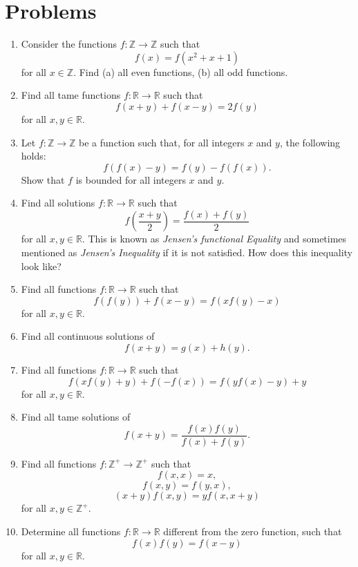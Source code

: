 \documentclass[11pt,a5paper]{article}
\begin{document}
\section{Problems}

\begin{enumerate}

\item{Consider the functions  $f: \mathbb{Z} \to \mathbb{Z}$ such that 
\[f(x)=f(x^2+x+1)\]
for all $x \in \mathbb{Z}$. Find (a) all even functions, (b) all odd functions.}

\item{Find all tame functions $f: \mathbb{R} \to \mathbb{R}$  such that
\[f(x+y)+f(x-y)=2f(y)\]
for all $x,y \in \mathbb{R}$.}

\item{Let $f: \mathbb{Z} \to \mathbb{Z}$ be a function such that, for all integers $x$ and $y$, the following holds:
\[f(f(x)-y)=f(y)-f(f(x)).\]
Show that $f$ is bounded for all integers $x$ and $y$.}

\item{Find all solutions $f: \mathbb{R} \to \mathbb{R}$  such that
\[f\left(\frac{x+y}{2}\right)=\frac{f(x)+f(y)}{2}\]
for all $x,y \in \mathbb{R}$. This is known as \emph{Jensen's functional Equality} and sometimes mentioned as \emph{Jensen's Inequality}  if it is not satisfied. How does this inequality look like? } 

\item{Find all functions $f: \mathbb{R} \to \mathbb{R}$  such that
\[f(f(y))+f(x-y)=f(xf(y)-x)\]
for all $x,y \in \mathbb{R}$.}

\item{Find all continuous solutions of 
\[f(x+y)=g(x)+h(y).\]}

\item{Find all functions $f: \mathbb{R} \to \mathbb{R}$ such that
\[f(xf(y)+y)+f(-f(x))=f(yf(x)-y)+y\]
for all $x,y \in \mathbb{R}$.}

\item{Find all tame solutions of
\[f(x+y)=\frac{f(x)f(y)}{f(x)+f(y)}.\]}

\item{Find all functions $f: \mathbb{Z^+} \to \mathbb{Z^+}$ such that
\[f(x,x)=x,\]
\[f(x,y)=f(y,x),\]
\[(x+y)f(x,y)=yf(x,x+y)\]
for all $x,y \in \mathbb{Z^+}$.}


\item{Determine all functions  $f: \mathbb{R} \to \mathbb{R}$ different from the zero function,  such that
\[f(x)f(y)=f(x-y)\]
for all $x,y \in \mathbb{R}$.}


\end{enumerate}
\end{document}
